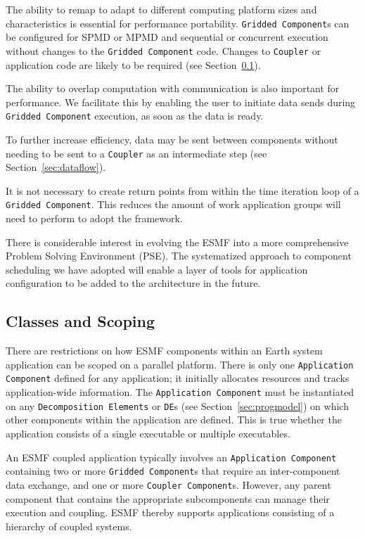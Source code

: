 The ability to remap to adapt to different computing platform sizes 
and characteristics is essential for performance portability.
{\tt Gridded Component}s can be configured for SPMD or MPMD and 
sequential or concurrent execution without changes to the {\tt Gridded 
Component} code.  Changes to {\tt Coupler} or application code are likely to 
be required (see Section~\ref{sec:scoping}).

The ability to overlap computation with communication is also important for
performance.  We facilitate this by enabling the user to initiate data 
sends during {\tt Gridded Component} execution, as soon as the data is ready.

To further increase efficiency, data may be sent between components without 
needing to be sent to a {\tt Coupler} as an intermediate step (see
Section~\ref{sec:dataflow}).

It is not necessary to create return points from 
within the time iteration loop of a {\tt Gridded Component}.  This reduces the
amount of work application groups will need to perform to adopt the 
framework.

There is considerable interest in evolving the ESMF into a more comprehensive
Problem Solving Environment (PSE).  The systematized approach to component 
scheduling we have adopted will enable a layer of tools for application 
configuration to be added to the architecture in the future.

\subsection{Classes and Scoping}
\label{sec:scoping}
There are restrictions on how ESMF components within an Earth system application 
can be scoped on a parallel platform.  There is only one {\tt Application Component} 
defined for any application; it initially allocates resources and tracks 
application-wide information. 
The {\tt Application Component} must be instantiated on 
any {\tt Decomposition Elements} or {\tt DE}s (see Section~\ref{sec:progmodel}) on 
which other components
within the application are defined.  This is true whether the 
application consists of a single executable or multiple 
executables.  

An ESMF coupled application typically involves an {\tt Application Component} 
containing two or more {\tt Gridded Component}s that require an 
inter-component data exchange, and one or more {\tt Coupler 
Component}s.  However, any parent component that contains the appropriate 
subcomponents can manage their execution and coupling.  ESMF thereby
supports applications consisting of a hierarchy of coupled systems.

